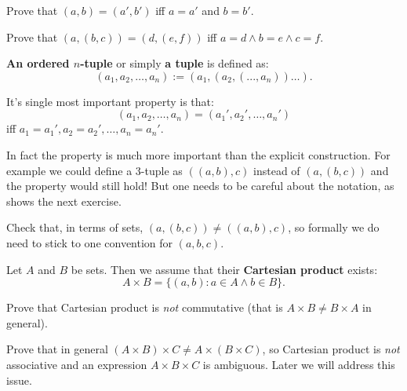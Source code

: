 \begin{prob}
  Prove that $(a,b)=(a',b')$ iff $a=a'$ and $b=b'$.
\end{prob}

\begin{prob}
  Prove that $(a,(b,c))=(d,(e,f))$ iff $a=d\wedge b=e\wedge c=f$.
\end{prob}

\begin{definition}
  \textbf{An ordered $n$-tuple} or simply \textbf{a tuple} is defined as:
  $$(a_1,a_2,\dots, a_n) := (a_1, (a_2, (..., a_n)) \dots ).$$

  It's single most important property is that:
  $$(a_1,a_2,\dots,a_n)=(a_1', a_2', \dots, a_n')$$ iff $a_1=a_1', a_2=a_2', \dots, a_n=a_n'.$
\end{definition}

In fact the property is much more important than the explicit construction. For example we could define a 3-tuple as $((a,b),c)$ instead of $(a, (b,c))$ and
the property would still hold! But one needs to be careful about the notation, as shows the next exercise.

\begin{exercise}
  Check that, in terms of sets, $(a,(b,c))\neq ((a,b),c)$, so formally we do need to stick to one convention for $(a,b,c)$.
\end{exercise}

\begin{definition}
  Let $A$ and $B$ be sets. Then we assume that their
  \textbf{Cartesian product} exists:
  $$A\times B = \{(a,b) : a\in A\wedge b\in B\}.$$
\end{definition}

\begin{exercise}
  Prove that Cartesian product is \textit{not} commutative (that is $A\times B\neq B\times A$ in general).
\end{exercise}

\begin{prob}
  Prove that in general $(A\times B)\times C\neq A\times (B\times C)$, so Cartesian product is \textit{not} associative and an expression $A\times B\times C$ is ambiguous.
  Later we will address this issue.
\end{prob}

